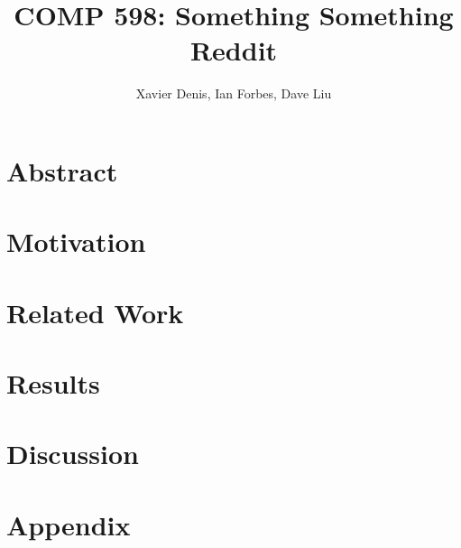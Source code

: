 \documentclass[11pt,twocolumn]{article}
\title {COMP 598: Something Something Reddit}
\author {Xavier Denis, Ian Forbes, Dave Liu}
\begin{document}
\maketitle

\section {Abstract}

\section {Motivation}

\section {Related Work}

\section {Results}

\section {Discussion}

\section {Appendix}
\end{document}
